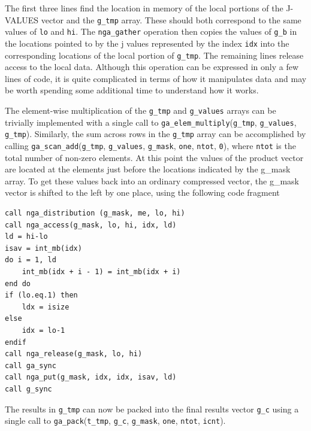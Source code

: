 The first three lines find the location in memory of the local portions
of the J-VALUES vector and the \texttt{g\_tmp} array. These should
both correspond to the same values of \texttt{lo} and \texttt{hi}.
The \texttt{nga\_gather} operation then copies the values of \texttt{g\_b}
in the locations pointed to by the j values represented by the index
\texttt{idx} into the corresponding locations of the local portion
of \texttt{g\_tmp}. The remaining lines release access to the local
data. Although this operation can be expressed in only a few lines
of code, it is quite complicated in terms of how it manipulates data
and may be worth spending some additional time to understand how it
works.

The element-wise multiplication of the \texttt{g\_tmp} and \texttt{g\_values}
arrays can be trivially implemented with a single call to \texttt{ga\_elem\_multiply}(\texttt{g\_tmp},
\texttt{g\_values},\texttt{ g\_tmp}). Similarly, the sum across rows
in the \texttt{g\_tmp} array can be accomplished by calling \texttt{ga\_scan\_add}(\texttt{g\_tmp},
\texttt{g\_values}, \texttt{g\_mask}, \texttt{one}, \texttt{ntot},
\texttt{0}), where \texttt{ntot} is the total number of non-zero elements.
At this point the values of the product vector are located at the
elements just before the locations indicated by the g\_mask array.
To get these values back into an ordinary compressed vector, the g\_mask
vector is shifted to the left by one place, using the following code
fragment
\begin{lstlisting}[style=cppnoframe]
call nga_distribution (g_mask, me, lo, hi)
call nga_access(g_mask, lo, hi, idx, ld)
ld = hi-lo
isav = int_mb(idx)
do i = 1, ld
    int_mb(idx + i - 1) = int_mb(idx + i)
end do
if (lo.eq.1) then
    ldx = isize
else
    idx = lo-1
endif 
call nga_release(g_mask, lo, hi)
call ga_sync
call nga_put(g_mask, idx, idx, isav, ld)
call g_sync
\end{lstlisting}

The results in \texttt{g\_tmp} can now be packed into the final results
vector \texttt{g\_c} using a single call to \texttt{ga\_pack}(\texttt{t\_tmp},
\texttt{g\_c}, \texttt{g\_mask}, \texttt{one}, \texttt{ntot}, \texttt{icnt}). 

